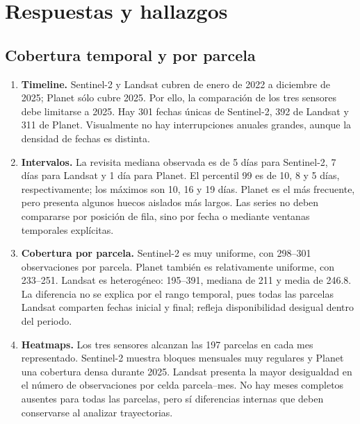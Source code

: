 ﻿\documentclass[11pt,a4paper]{article}
\begin{document}
\section{Respuestas y hallazgos}

\subsection{Cobertura temporal y por parcela}
\begin{enumerate}
  \item \textbf{Timeline.} Sentinel-2 y Landsat cubren de enero de 2022 a
  diciembre de 2025; Planet sólo cubre 2025. Por ello, la comparación de los
  tres sensores debe limitarse a 2025. Hay 301 fechas únicas de Sentinel-2, 392
  de Landsat y 311 de Planet. Visualmente no hay interrupciones anuales grandes,
  aunque la densidad de fechas es distinta.

  \item \textbf{Intervalos.} La revisita mediana observada es de 5 días para
  Sentinel-2, 7 días para Landsat y 1 día para Planet. El percentil 99 es de 10,
  8 y 5 días, respectivamente; los máximos son 10, 16 y 19 días. Planet es el
  más frecuente, pero presenta algunos huecos aislados más largos. Las series
  no deben compararse por posición de fila, sino por fecha o mediante ventanas
  temporales explícitas.

  \item \textbf{Cobertura por parcela.} Sentinel-2 es muy uniforme, con
  298--301 observaciones por parcela. Planet también es relativamente uniforme,
  con 233--251. Landsat es heterogéneo: 195--391, mediana de 211 y media de
  246.8. La diferencia no se explica por el rango temporal, pues todas las
  parcelas Landsat comparten fechas inicial y final; refleja disponibilidad
  desigual dentro del periodo.

  \item \textbf{Heatmaps.} Los tres sensores alcanzan las 197 parcelas en cada
  mes representado. Sentinel-2 muestra bloques mensuales muy regulares y Planet
  una cobertura densa durante 2025. Landsat presenta la mayor desigualdad en el
  número de observaciones por celda parcela--mes. No hay meses completos
  ausentes para todas las parcelas, pero sí diferencias internas que deben
  conservarse al analizar trayectorias.
\end{enumerate}
\end{document}
